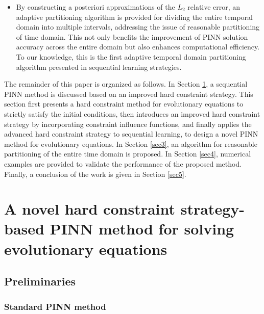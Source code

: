 \documentclass[preprint]{elsarticle}
\numberwithin{table}{section}
\numberwithin{equation}{section}
\numberwithin{figure}{section}
\begin{document}
\begin{CJK}{UTF8}{gbsn}
\begin{itemize}
 
  \item  
By constructing a posteriori approximations of the $L_2$ relative error, an adaptive partitioning algorithm is provided for dividing the entire temporal domain  into multiple intervals, addressing the issue of reasonable partitioning of time domain. This not only benefits the improvement of PINN solution accuracy across the entire domain but also enhances computational efficiency. To our knowledge, this is  {the first}  adaptive temporal domain  partitioning algorithm presented in sequential learning strategies.
 
\end{itemize}

 

The remainder of this paper is organized as follows. In Section \ref{sec2},  a sequential PINN method is discussed based on an improved hard constraint strategy. This section first presents a hard constraint method for evolutionary equations to strictly satisfy the initial conditions, then introduces an improved hard constraint strategy by incorporating constraint influence functions, and finally applies the advanced hard constraint strategy to sequential learning,   to design  a novel PINN method for  evolutionary equations. In Section \ref{sec3}, an algorithm for   reasonable partitioning of the entire time domain is proposed. In Section \ref{sec4}, numerical examples are provided to validate the performance of the proposed method. Finally, a conclusion of the work is given in 
 Section \ref{sec5}. 
 

\section{A novel hard constraint strategy-based PINN method for solving evolutionary equations}\label{sec2}

\subsection{Preliminaries}

\subsubsection{ Standard PINN method}


\end{CJK}
\end{document}
